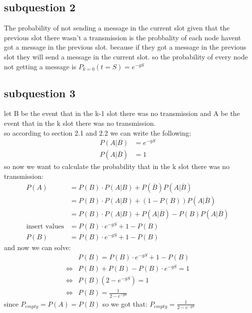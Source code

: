 \documentclass{article}
\begin{document}
\subsection{subquestion 2}
The probability of not sending a message in the current slot given that the previous slot there wasn't a transmission is the probbality of each node havent 
got a message in the previous slot. because if they got a message in the previous slot they will send a message in the current slot.
so the probability of every node not getting a message is $P_{k=0}{(t =S)} = e^{-gS}$

\subsection{subquestion 3}
let B be the event that in the k-1 slot there was no transmission and A be the event that in the k slot there was no transmission.\\
so according to section 2.1 and 2.2 we can write the following:
\begin{equation}
    \begin{aligned}
        P(A|B) &= e^{-gS}\\
        P(A|\overline{B}) &= 1
    \end{aligned}
\end{equation}
so now we want to calculate the probability that in the k slot there was no transmission:
\begin{equation}
    \begin{aligned}
        P(A) &= P(B)\cdot P(A|B) + P(\overline{B})P(A|\overline{B})\\
        &= P(B)\cdot P(A|B) + (1-P(B))P(A|\overline{B})\\
        & = P(B)\cdot P(A|B) + P(A|\overline{B}) -P(B)P(A|\overline{B})\\
        \text{insert values} & = P(B)\cdot e^{-gS} + 1 -P(B)\\
        P(B) &= P(B)\cdot e^{-gS} + 1 -P(B)
    \end{aligned}
\end{equation}
and now we can solve:
\begin{equation}
    \begin{aligned}
        &P(B) = P(B)\cdot e^{-gS} + 1 -P(B)\\
        \iff& P(B)+P(B) - P(B)\cdot e^{-gS} = 1 \\
        \iff& P(B)(2- e^{-gS}) = 1 \\
        \iff& P(B) = \frac{1}{2- e^{-gS}}
    \end{aligned}
\end{equation}
since $P_{empty} = P(A) = P(B)$ so we got that: $P_{empty} = \frac{1}{2- e^{-gS}}$\\
\end{document}
